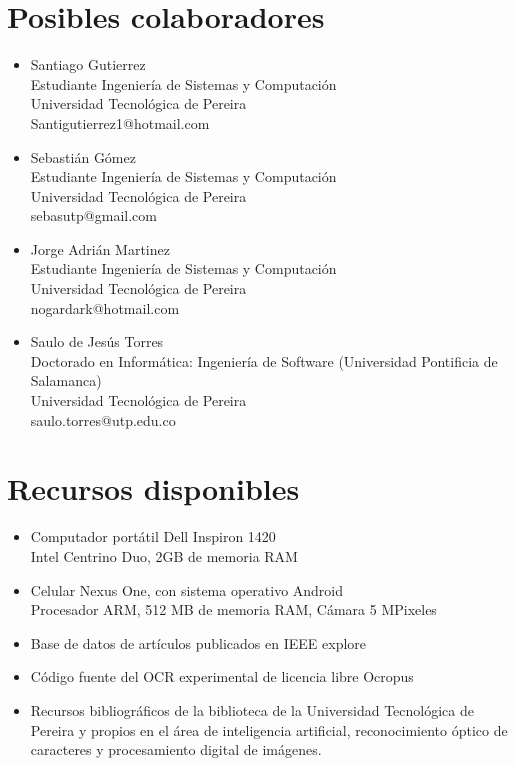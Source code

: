 \documentclass[a4paper, 11pt, oneside]{article}
\begin{document}
	\section{Posibles colaboradores}
	\begin{itemize}
   \item Santiago Gutierrez\\
Estudiante Ingeniería de Sistemas y Computación\\
Universidad Tecnológica de Pereira\\
Santigutierrez1@hotmail.com
   \item Sebastián Gómez\\
Estudiante Ingeniería de Sistemas y Computación\\
Universidad Tecnológica de Pereira\\
sebasutp@gmail.com
   \item Jorge Adrián Martinez\\
Estudiante Ingeniería de Sistemas y Computación\\
Universidad Tecnológica de Pereira\\
nogardark@hotmail.com
   \item Saulo de Jesús Torres\\
Doctorado en Informática: Ingeniería de Software (Universidad Pontificia de Salamanca)\\
Universidad Tecnológica de Pereira\\
saulo.torres@utp.edu.co
	\end{itemize}
	\clearpage
	
	\section{Recursos disponibles}
	\begin{itemize}
		\item Computador portátil Dell Inspiron 1420\\
			Intel Centrino Duo, 2GB de memoria RAM
		\item Celular Nexus One, con sistema operativo Android\\
			Procesador ARM, 512 MB de memoria RAM, Cámara 5 MPixeles
		\item Base de datos de artículos publicados en IEEE explore
		\item Código fuente del OCR experimental de licencia libre Ocropus
	    \item Recursos bibliográficos de la biblioteca de la Universidad Tecnológica de Pereira y propios en el área de inteligencia artificial, reconocimiento óptico de caracteres y procesamiento digital de imágenes.
	\end{itemize}
	\clearpage


\nocite{*}
\end{document}
